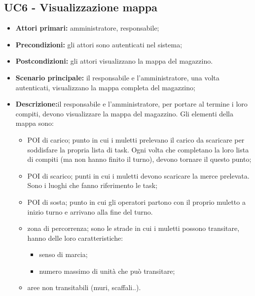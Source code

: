 \subsection{UC6 - Visualizzazione mappa}
\begin{itemize}
	\item 	\textbf{Attori primari:} amministratore, responsabile;
	\item 	\textbf{Precondizioni:} gli attori sono autenticati nel sistema;
	\item 	\textbf{Postcondizioni:} gli attori visualizzano la mappa del magazzino.
	\item 	\textbf{Scenario principale:} il responsabile e l’amministratore, una volta autenticati, visualizzano la mappa completa del magazzino;
	\item 	\textbf{Descrizione:}il responsabile e l’amministratore, per portare al termine i loro compiti, devono visualizzare la mappa del magazzino. Gli elementi della mappa sono:
	\begin{itemize}
		\item POI di carico; punto in cui i muletti prelevano il carico da scaricare per soddisfare la propria lista di task. Ogni volta che completano la loro lista di compiti (ma non hanno finito il turno), devono tornare il questo punto;
		\item POI di scarico; punti in cui i muletti devono scaricare la merce prelevata. Sono i luoghi che fanno riferimento le task;
		\item POI di sosta; punto in cui gli operatori partono con il proprio muletto a inizio turno e arrivano alla fine del turno.
		\item zona di percorrenza; sono le strade in cui i muletti possono transitare, hanno delle loro caratteristiche:
		\begin{itemize}
			\item senso di marcia;
			\item numero massimo di unità che può transitare;
		\end{itemize}
		\item aree non transitabili (muri, scaffali..).
	\end{itemize}

\end{itemize}


